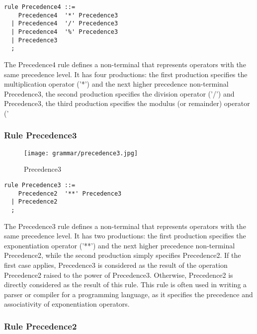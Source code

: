 \begin{lstlisting}
rule Precedence4 ::=
    Precedence4  '*' Precedence3 
  | Precedence4  '/' Precedence3 
  | Precedence4  '%' Precedence3 
  | Precedence3 
  ;
\end{lstlisting}

The Precedence4 rule defines a non-terminal that represents operators with the same precedence level. It has four productions: the first production specifies the multiplication operator ('*') and the next higher precedence non-terminal Precedence3, the second production specifies the division operator ('/') and Precedence3, the third production specifies the modulus (or remainder) operator ('%

\subsubsection*{Rule Precedence3}

\begin{figure}[!ht]
\centering
\texttt{[image: grammar/precedence3.jpg]}
\caption{Precedence3}
\end{figure}

\begin{lstlisting}
rule Precedence3 ::=
    Precedence2  '**' Precedence3 
  | Precedence2 
  ;
\end{lstlisting}



The Precedence3 rule defines a non-terminal that represents operators with the same precedence level. It has two productions: the first production specifies the exponentiation operator ('**') and the next higher precedence non-terminal Precedence2, while the second production simply specifies Precedence2. If the first case applies, Precedence3 is considered as the result of the operation Precedence2 raised to the power of Precedence3. Otherwise, Precedence2 is directly considered as the result of this rule. This rule is often used in writing a parser or compiler for a programming language, as it specifies the precedence and associativity of exponentiation operators.

\subsubsection*{Rule Precedence2}

